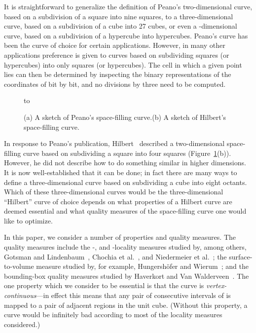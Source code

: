 \documentclass[11pt,a4paper]{article}
\begin{document}
It is straightforward to generalize the definition of Peano's two-dimensional curve, based on a subdivision of a square into nine squares, to a three-dimensional curve, based on a subdivision of a cube into 27 cubes, or even a -dimensional curve, based on a subdivision of a hypercube into  hypercubes. Peano's curve has been the curve of choice for certain applications. However, in many other applications preference is given to curves based on subdividing squares (or hypercubes) into only  squares (or hypercubes). The cell in which a given point  lies can then be determined by inspecting the binary representations of the coordinates of  bit by bit, and no divisions by three need to be computed. 
\begin{figure}
\centering
\hbox to 
\caption{(a) A sketch of Peano's space-filling curve.\quad (b) A sketch of Hilbert's space-filling curve.}
\label{fig:peano2d}\label{fig:hilbert2d}
\end{figure}

In response to Peano's publication, Hilbert~\cite{Hilbert} described a two-dimensional space-filling curve based on subdividing a square into four squares (Figure~\ref{fig:hilbert2d}(b)). However, he did not describe how to do something similar in higher dimensions. It is now well-established that it can be done; in fact there are many ways to define a three-dimensional curve based on subdividing a cube into eight octants. Which of these three-dimensional curves would be the three-dimensional ``Hilbert'' curve of choice depends on what properties of a Hilbert curve are deemed essential and what quality measures of the space-filling curve one would like to optimize.

In this paper, we consider a number of properties and quality measures. The quality measures include the -,  and -locality measures studied by, among others, Gotsman and Lindenbaum~\cite{Gotsman}, Chochia et al.~\cite{Chochia}, and Niedermeier et al.~\cite{Niedermeier,Niedermeier-Manhattan}; the surface-to-volume measure studied by, for example, Hungersh\"ofer and Wierum~\cite{Hungershoefer}; and the bounding-box quality measures studied by Haverkort and Van Walderveen~\cite{Haverkort}. The one property which we consider to be essential is that the curve is \emph{vertex-continuous}---in effect this means that any pair of consecutive intervals of  is mapped to a pair of adjacent regions in the unit cube. (Without this property, a curve would be infinitely bad according to most of the locality measures considered.)
\end{document}
